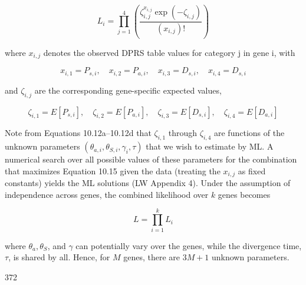 \documentclass{article}
\begin{document}
\begin{equation}
L_{i}=\prod_{j=1}^{4}\left(\frac{\zeta_{i,j}^{x_{i,j}}\exp(-\zeta_{i,j})}{(x_{i,j})!}\right)
\tag{10.15}
\label{eq:10_15}
\end{equation}

where  $ x_{i,j} $ denotes the observed DPRS table values for category j in gene i, with

\begin{equation}
x_{i,1}=P_{s,i},\quad x_{i,2}=P_{a,i},\quad x_{i,3}=D_{s,i},\quad x_{i,4}=D_{s,i}
\end{equation}

and  $ \zeta_{i,j} $ are the corresponding gene-specific expected values,

\begin{equation}
\zeta_{i,1}=E[P_{s,i}],\quad\zeta_{i,2}=E[P_{a,i}],\quad\zeta_{i,3}=E[D_{s,i}],\quad\zeta_{i,4}=E[D_{a,i}]
\end{equation}

Note from Equations 10.12a–10.12d that  $ \zeta_{i,1} $ through  $ \zeta_{i,4} $ are functions of the unknown parameters  $ (\theta_{a,i}, \theta_{S,i}, \gamma_i, \tau) $ that we wish to estimate by ML. A numerical search over all possible values of these parameters for the combination that maximizes Equation 10.15 given the data (treating the  $ x_{i,j} $ as fixed constants) yields the ML solutions (LW Appendix 4). Under the assumption of independence across genes, the combined likelihood over  $ k $ genes becomes

\begin{equation}
L=\prod_{i=1}^{k}L_{i}
\end{equation}

where  $ \theta_a, \theta_S $, and  $ \gamma $ can potentially vary over the genes, while the divergence time,  $ \tau $, is shared by all. Hence, for  $ M $ genes, there are  $ 3M + 1 $ unknown parameters.

372
\end{document}
